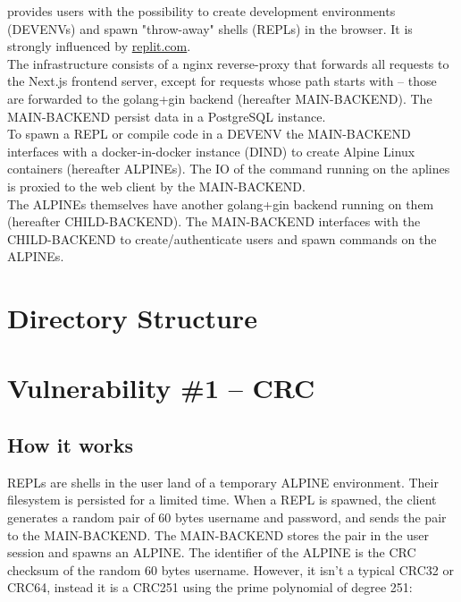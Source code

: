 \documentclass[10pt]{article}
\begin{document}
 provides users with the possibility to create development environments (DEVENVs) and spawn "throw-away" shells (REPLs) in the browser. It is strongly influenced by \href{https://replit.com}{replit.com}. \\

The infrastructure consists of a nginx reverse-proxy that forwards all requests to the Next.js frontend server, except for requests whose path starts with  -- those are forwarded to the golang+gin backend (hereafter MAIN-BACKEND). The MAIN-BACKEND persist data in a PostgreSQL instance. \\

To spawn a REPL or compile code in a DEVENV the MAIN-BACKEND interfaces with a docker-in-docker instance (DIND) to create Alpine Linux containers (hereafter ALPINEs). The IO of the command running on the aplines is proxied to the web client by the MAIN-BACKEND. \\

The ALPINEs themselves have another golang+gin backend running on them (hereafter CHILD-BACKEND). The MAIN-BACKEND interfaces with the CHILD-BACKEND to create/authenticate users and spawn commands on the ALPINEs.

\section{Directory Structure}



\section{Vulnerability \#1 -- CRC}

\subsection{How it works}

REPLs are  shells in the user land of a temporary ALPINE environment. Their filesystem is persisted for a limited time. When a REPL is spawned, the client generates a random pair of 60 bytes username and password, and sends the pair to the MAIN-BACKEND. The MAIN-BACKEND stores the pair in the user session and spawns an ALPINE. The identifier of the ALPINE is the CRC checksum of the random 60 bytes username. However, it isn't a typical CRC32 or CRC64, instead it is a CRC251 using the prime polynomial of degree 251:
\begin{center}
\end{center}
\end{document}
